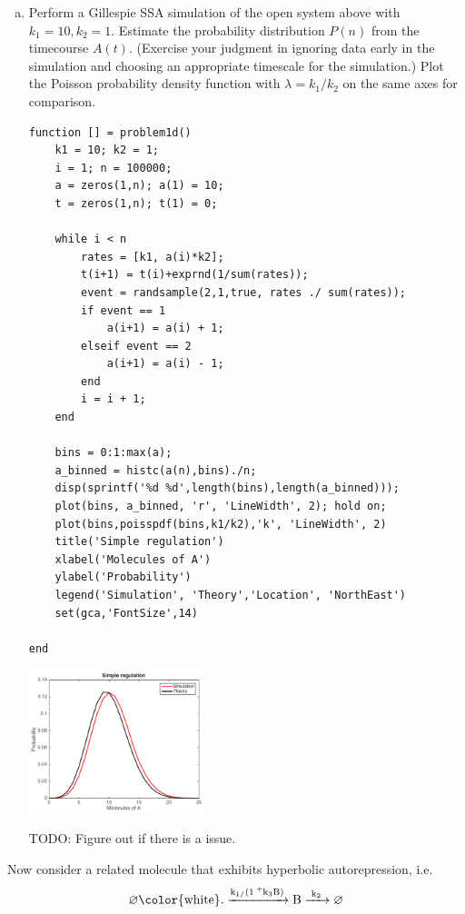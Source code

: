 \documentclass{article}
\begin{document}
\begin{enumerate}[a)]
\item Perform a Gillespie SSA simulation of the open system above with $k_1=10, k_2=1$. Estimate the probability distribution $P(n)$ from the timecourse $A(t)$. (Exercise your judgment in ignoring data early in the simulation and choosing an appropriate timescale for the simulation.) Plot the Poisson probability density function with $\lambda=k_1/k_2$ on the same axes for comparison.\\

\begin{lstlisting}
function [] = problem1d()
    k1 = 10; k2 = 1;
    i = 1; n = 100000;
    a = zeros(1,n); a(1) = 10;
    t = zeros(1,n); t(1) = 0;
    
    while i < n
        rates = [k1, a(i)*k2];
        t(i+1) = t(i)+exprnd(1/sum(rates));
        event = randsample(2,1,true, rates ./ sum(rates));
        if event == 1
            a(i+1) = a(i) + 1;
        elseif event == 2
            a(i+1) = a(i) - 1;
        end
        i = i + 1;
    end
    
    bins = 0:1:max(a);
    a_binned = histc(a(n),bins)./n;
    disp(sprintf('%d %d',length(bins),length(a_binned)));
    plot(bins, a_binned, 'r', 'LineWidth', 2); hold on;
    plot(bins,poisspdf(bins,k1/k2),'k', 'LineWidth', 2)
    title('Simple regulation')
    xlabel('Molecules of A')
    ylabel('Probability')
    legend('Simulation', 'Theory','Location', 'NorthEast')
    set(gca,'FontSize',14)
    
end
\end{lstlisting}

\begin{center}
\includegraphics[width=0.4\textwidth]{prob1d.pdf}
\end{center}

{\color{red}
TODO: Figure out if there is a  issue.
}

\end{enumerate}
Now consider a related molecule that exhibits hyperbolic autorepression, i.e.
\[ \ce{\varnothing {\color{white} .} ->[k_1/(1+k_3B)] B ->[k_2] \varnothing} \]
\end{document}
